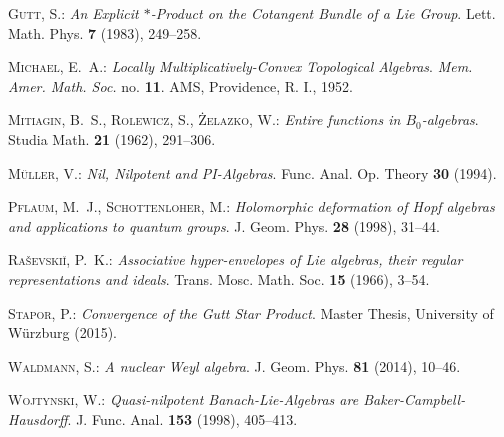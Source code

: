 \documentclass[
11pt,                          %
english                        %
]{article}
\begin{document}
\begin{thebibliography}{1}
\textsc{Gutt, S.: }\newblock \emph{An Explicit $*$-Product on the Cotangent
  Bundle of a Lie Group}.
\newblock Lett. Math. Phys.  \textbf{7} (1983), 249--258.

\textsc{Michael, E.~A.: }\newblock \emph{Locally Multiplicatively-Convex
  Topological Algebras}.
\newblock \emph{Mem. Amer. Math. Soc.} no. \textbf{11}.
\newblock AMS, Providence, R. I., 1952.

\textsc{Mitiagin, B.~S., Rolewicz, S., {\.{Z}}elazko, W.: }\newblock
  \emph{Entire functions in $B_0$-algebras}.
\newblock Studia Math.  \textbf{21} (1962), 291--306.

\textsc{M{\"u}ller, V.: }\newblock \emph{Nil, Nilpotent and PI-Algebras}.
\newblock Func. Anal. Op. Theory  \textbf{30} (1994).

\textsc{Pflaum, M.~J., Schottenloher, M.: }\newblock \emph{Holomorphic
  deformation of Hopf algebras and applications to quantum groups}.
\newblock J. Geom. Phys.  \textbf{28} (1998), 31--44.

\textsc{Ra{\v{s}}evski{\u{i}}, P.~K.: }\newblock \emph{Associative
  hyper-envelopes of Lie algebras, their regular representations and ideals}.
\newblock Trans. Mosc. Math. Soc.  \textbf{15} (1966), 3--54.

\textsc{Stapor, P.: }\newblock \emph{Convergence 
  of the Gutt Star Product}.
\newblock Master Thesis, University of W\"urzburg (2015).

\textsc{Waldmann, S.: }\newblock \emph{A nuclear Weyl algebra}.
\newblock J. Geom. Phys.  \textbf{81} (2014), 10--46.

\textsc{Wojtynski, W.: }\newblock \emph{Quasi-nilpotent 
{B}anach-{L}ie-Algebras are {B}aker-{C}ampbell-{H}ausdorff}.
\newblock J. Func. Anal.  \textbf{153} (1998), 405--413.

\end{thebibliography}



\end{document}
